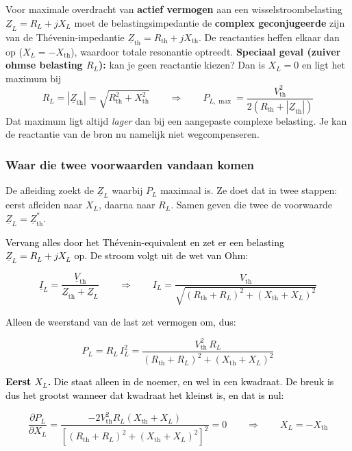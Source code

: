 \documentclass[a4paper,11pt]{article}
\newcommand{\stapreden}[1]{\par\vspace{1.4mm}\noindent\textcolor{black}{#1}\par\vspace{-2mm}}
\begin{document}
{Voor maximale overdracht van \textbf{actief vermogen} aan een wisselstroombelasting $\underline{Z}_L = R_L + jX_L$ moet de belastingsimpedantie de \textbf{complex geconjugeerde} zijn van de Thévenin-impedantie $\underline{Z}_{\text{th}} = R_{\text{th}} + jX_{\text{th}}$.
    De reactanties heffen elkaar dan op ($X_L = -X_{\text{th}}$), waardoor totale resonantie optreedt.
    \newline
    \textbf{Speciaal geval (zuiver ohmse belasting $R_L$):} kan je geen reactantie kiezen? Dan is
    $X_L = 0$ en ligt het maximum bij
    \[R_L = |\underline{Z}_{\text{th}}| = \sqrt{R_{\text{th}}^2 + X_{\text{th}}^2}
        \qquad\Longrightarrow\qquad
        P_{L,\max} = \frac{V_{\text{th}}^2}{2\left(R_{\text{th}} + |\underline{Z}_{\text{th}}|\right)}\]
    Dat maximum ligt altijd \emph{lager} dan bij een aangepaste complexe belasting. Je kan de
    reactantie van de bron nu namelijk niet wegcompenseren.}

\subsubsection{Waar die twee voorwaarden vandaan komen}

De afleiding zoekt de $\underline{Z}_L$ waarbij $P_L$ maximaal is. Ze doet dat in twee stappen:
eerst afleiden naar $X_L$, daarna naar $R_L$. Samen geven die twee de voorwaarde
$\underline{Z}_L = \underline{Z}_{\text{th}}^{*}$.

\stapreden{Vervang alles door het Th\'evenin-equivalent en zet er een belasting $\underline{Z}_L = R_L + jX_L$ op. De stroom volgt uit de wet van Ohm:}
\[\underline{I}_L = \frac{\underline{V}_{\text{th}}}{\underline{Z}_{\text{th}} + \underline{Z}_L}
    \qquad\Longrightarrow\qquad
    I_L = \frac{V_{\text{th}}}{\sqrt{(R_{\text{th}}+R_L)^2 + (X_{\text{th}}+X_L)^2}}\]

\stapreden{Alleen de weerstand van de last zet vermogen om, dus:}
\[P_L = R_L\,I_L^2 = \frac{V_{\text{th}}^2\,R_L}{(R_{\text{th}}+R_L)^2 + (X_{\text{th}}+X_L)^2}\]

\stapreden{\textbf{Eerst $X_L$.} Die staat alleen in de noemer, en wel in een kwadraat. De breuk is dus het grootst wanneer dat kwadraat het kleinst is, en dat is nul:}
\[\frac{\partial P_L}{\partial X_L}
    = \frac{-2V_{\text{th}}^2 R_L (X_{\text{th}}+X_L)}{\left[(R_{\text{th}}+R_L)^2 + (X_{\text{th}}+X_L)^2\right]^2} = 0
    \qquad\Longrightarrow\qquad \boxed{X_L = -X_{\text{th}}}\]
\end{document}
